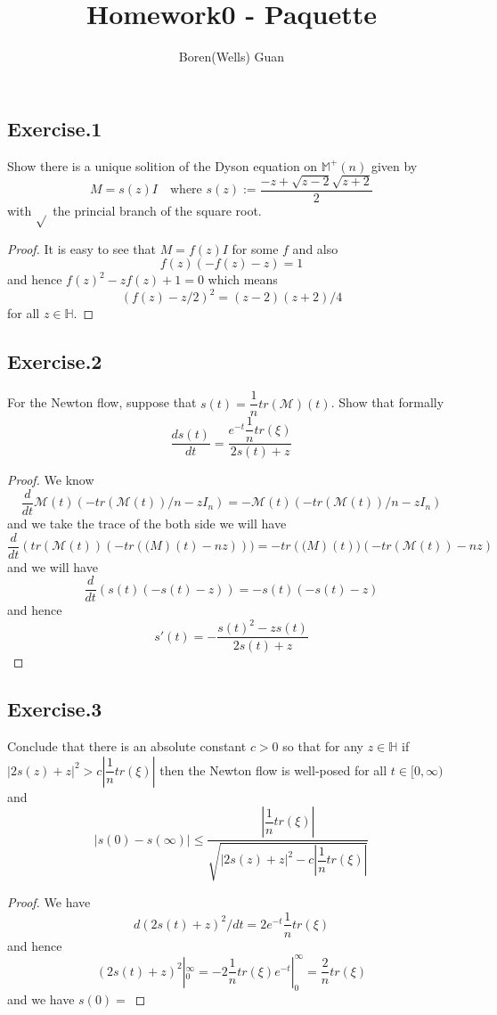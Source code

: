 \documentclass[lang=en,11pt,a4paper,citestyle =authoryear]{elegantpaper}
\title{Homework0 - Paquette}
\author{Boren(Wells) Guan}
\begin{document}
\maketitle

\subsection*{Exercise.1}Show there is a unique solition of the Dyson equation on $\mathbb{M}^+(n)$ given by
\[
M = s(z)I\quad\text{where }s(z):=\dfrac{-z+\sqrt{z-2}\sqrt{z+2}}{2}
\]
with $\sqrt{}$ the princial branch of the square root.
\begin{proof}
    It is easy to see that $M = f(z)I$ for some $f$ and also
    \[
    f(z)(-f(z) - z) = 1
    \]
    and hence $f(z)^2 - zf(z) + 1 = 0$ which means
    \[
    (f(z) - z/2)^2 = (z-2)(z+2)/4
    \]
    for all $z \in \mathbb{H}$.
\end{proof}

\subsection*{Exercise.2} For the Newton flow, suppose that $s(t) = \dfrac{1}{n}tr(\mathcal{M})(t)$. Show that formally
\[
\dfrac{ds(t)}{dt} = \dfrac{e^{-t}\dfrac{1}{n}tr(\xi)}{2s(t)+z}
\]
\begin{proof}
    We know
    \[
    \dfrac{d}{dt} \mathcal{M}(t)(-tr(\mathcal{M}(t))/n - zI_n)  = -\mathcal{M}(t)(-tr(\mathcal{M}(t))/n - zI_n)
    \]
    and we take the trace of the both side we will have
    \[
    \dfrac{d}{dt}(tr(\mathcal{M}(t))(-tr(\mathcal(M)(t)-nz))) = - tr(\mathcal(M)(t))(-tr(\mathcal{M}(t))- nz) 
    \]
    and we will have
    \[
    \dfrac{d}{dt}(s(t)(-s(t)-z)) = -s(t)(-s(t)-z)
    \]
    and hence
    \[
    s'(t)= -\dfrac{s(t)^2-zs(t)}{2s(t)+z}
    \]
\end{proof}

\subsection*{Exercise.3}Conclude that there is an absolute constant $c>0$ so that for any $z\in\mathbb{H}$ if $|2s(z)+z|^2 > c|\dfrac{1}{n}tr(\xi)|$ then the Newton flow is well-posed for all $t\in [0,\infty)$ and
\[
|s(0)- s(\infty)| \leq \dfrac{|\dfrac{1}{n}tr(\xi)|}{\sqrt{|2s(z)+z|^2 - c|\dfrac{1}{n}tr(\xi)|}}
\] 
\begin{proof}
    We have
    \[
    d(2s(t)+z)^2/dt = 2e^{-t}\dfrac{1}{n}tr(\xi) 
    \]
    and hence
    \[
    (2s(t)+z)^2|^{\infty}_0 = -2\dfrac{1}{n}tr(\xi) e^{-t}|^{\infty}_0 = \dfrac{2}{n}tr(\xi)
    \]
    and we have $s(0) = $
\end{proof}

\addappheadtotoc
\end{document}
